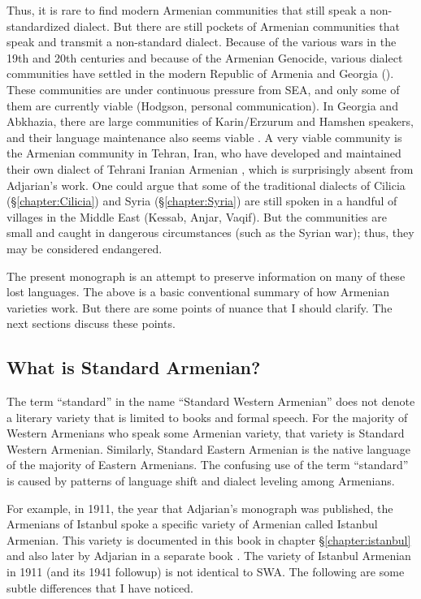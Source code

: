 \documentclass[output=paper]{langscibook}
\begin{document}
Thus, it is  rare to find modern Armenian communities that still speak a non-standardized dialect. But there are still pockets of Armenian communities that speak and transmit a non-standard dialect.  Because of the various wars in the 19th and 20th centuries and because of the Armenian Genocide, various dialect communities have settled in the modern Republic of Armenia and Georgia (\citealt[\S2.2.2]{Hodgson-2019-DissRelativeClauseArmenianSyntax}). These communities are under continuous pressure from SEA, and only some of them are currently viable (Hodgson, personal communication). In Georgia and Abkhazia, there  are  large communities of Karin/Erzurum and Hamshen speakers, and their language maintenance also seems viable \citep{Bezrukov-2022-DissCaucasusMotionArmenian}.  A very viable community is the Armenian community in Tehran, Iran, who have developed and maintained their own dialect of Tehrani Iranian Armenian \citep{DolatianEtAl-prep-IranianGrammar}, which is surprisingly absent from Adjarian's work. One could argue that some of the traditional dialects of Cilicia (\S\ref{chapter:Cilicia}) and Syria (\S\ref{chapter:Syria}) are still spoken in a handful of villages in the Middle East (Kessab, Anjar, Vaqif). But the communities are small and caught in dangerous circumstances (such as the Syrian war); thus, they may be considered endangered.

 The present monograph is an attempt to preserve information on many of these lost languages. The above is a basic conventional summary of how Armenian varieties work. But there are some points of nuance that I should clarify. The next sections discuss these points. 

 

\subsection{What is Standard Armenian?}\label{sec:HossepIntro:armenian:whatisstandard}
The term “standard” in the name “Standard Western Armenian” does not denote a literary variety that is limited to books and formal speech. For the majority of Western Armenians who speak some Armenian variety, that variety is Standard Western Armenian. Similarly, Standard Eastern Armenian is the native language of the majority of Eastern Armenians. The confusing use of the term “standard” is caused by patterns of language shift and dialect leveling among Armenians.

For example, in 1911, the year that   Adjarian's monograph was published, the Armenians of Istanbul spoke a specific variety of Armenian called Istanbul Armenian. This variety is documented in this book in chapter \S\ref{chapter:istanbul} and also later by Adjarian in a separate book \citep{Adjarian-1941-IstanbulDialect}. The variety of Istanbul Armenian in 1911 (and its 1941 followup) is not identical to SWA. The following are some subtle differences that I have noticed. 
\end{document}
